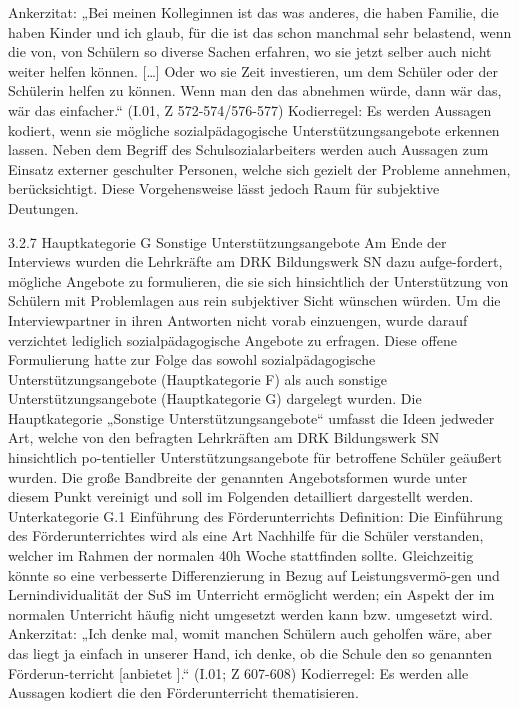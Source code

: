 Ankerzitat: „Bei meinen Kolleginnen ist das was anderes, die haben Familie, die haben Kinder und ich glaub, für die ist das schon manchmal sehr belastend, wenn die von, von Schülern so diverse Sachen erfahren, wo sie jetzt selber auch nicht weiter helfen können. […] Oder wo sie Zeit investieren, um dem Schüler oder der Schülerin helfen zu können. Wenn man den das abnehmen würde, dann wär das, wär das einfacher.“ (I.01, Z 572-574/576-577) 
Kodierregel: Es werden Aussagen kodiert, wenn sie mögliche sozialpädagogische  Unterstützungsangebote erkennen lassen. Neben dem Begriff des Schulsozialarbeiters werden auch Aussagen zum Einsatz externer geschulter Personen, welche sich gezielt der Probleme annehmen, berücksichtigt. Diese Vorgehensweise lässt jedoch Raum für subjektive Deutungen.

3.2.7 Hauptkategorie G Sonstige Unterstützungsangebote
Am Ende der Interviews wurden die Lehrkräfte am DRK Bildungswerk SN dazu aufge-fordert, mögliche Angebote zu formulieren, die sie sich hinsichtlich der Unterstützung von Schülern mit Problemlagen aus rein subjektiver Sicht wünschen würden. Um die Interviewpartner in ihren Antworten nicht vorab einzuengen, wurde darauf verzichtet lediglich sozialpädagogische Angebote zu erfragen. Diese offene Formulierung hatte zur Folge das sowohl sozialpädagogische Unterstützungsangebote (Hauptkategorie F) als auch sonstige Unterstützungsangebote (Hauptkategorie G) dargelegt wurden. 
Die Hauptkategorie „Sonstige Unterstützungsangebote“ umfasst die Ideen jedweder Art, welche von den befragten Lehrkräften am DRK Bildungswerk SN hinsichtlich po-tentieller Unterstützungsangebote für betroffene Schüler geäußert wurden. Die große Bandbreite der genannten Angebotsformen wurde unter diesem Punkt vereinigt und soll im Folgenden detailliert dargestellt werden.
Unterkategorie G.1 Einführung des Förderunterrichts
Definition: Die Einführung des Förderunterrichtes wird als eine Art Nachhilfe für die Schüler verstanden, welcher im Rahmen der normalen 40h Woche stattfinden sollte. Gleichzeitig könnte so eine verbesserte Differenzierung in Bezug auf Leistungsvermö-gen und Lernindividualität der SuS im Unterricht ermöglicht werden; ein Aspekt der im normalen Unterricht häufig nicht umgesetzt werden kann bzw. umgesetzt wird. 
Ankerzitat: „Ich denke mal, womit manchen Schülern auch geholfen wäre, aber das liegt ja einfach in unserer Hand, ich denke, ob die Schule den so genannten Förderun-terricht [anbietet ].“ (I.01; Z 607-608)
Kodierregel: Es werden alle Aussagen kodiert die den Förderunterricht thematisieren.

